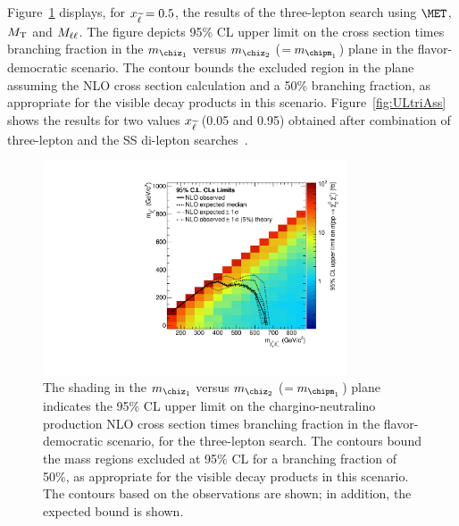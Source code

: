 Figure~\ref{fig:ULtriA} displays, for $x_{\widetilde{\ell}} = 0.5$, 
the results of the three-lepton search using $\MET$, $M_\mathrm{T}$ and $M_{\ell\ell}$. 
The figure depicts 95\% CL upper limit on the cross section times branching fraction in the $m_{\chiz_1}$
versus $m_{\chiz_2}$ ($=m_{\chipm_1}$) plane in the flavor-democratic scenario.
The contour bounds the excluded region in the plane assuming the NLO cross section
calculation and a 50\% branching fraction, as appropriate for the visible decay products in this scenario.
Figure~\ref{fig:ULtriAss} shows the results for two values $x_{\widetilde{\ell}}$ (0.05 and 0.95)
obtained after combination of three-lepton and the SS di-lepton searches~\cite{AN-2012:330}.
\begin{figure}[!p]
\begin{center}
\includegraphics[width=0.8\textwidth]{plots/exclusions/exclusion_TChiSlepSnu_2i_0_5_ru.pdf} 
\caption{
The shading in the $m_{\chiz_1}$ versus $m_{\chiz_2}$
($=m_{\chipm_1}$) plane indicates the 95\% CL upper limit on the
chargino-neutralino production NLO cross section times branching fraction
in the flavor-democratic scenario, for the 
three-lepton search.  The contours bound the mass regions excluded at 95\%
CL for a branching fraction of 50\%, as appropriate for the visible
decay products in this scenario. The contours based on the
observations are shown; in addition, the expected bound is shown. }
\label{fig:ULtriA}
\end{center}
\end{figure}
